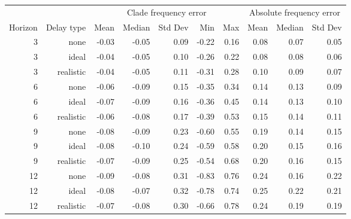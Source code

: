 
\begin{tabular*}{1.0\textwidth}{rrrrrrrrrr}
\toprule
        &            & \multicolumn{5}{c}{Clade frequency error} & \multicolumn{3}{c}{Absolute frequency error} \\
Horizon & Delay type & Mean & Median & Std Dev & Min & Max & Mean & Median & Std Dev \\
\midrule

3 & none & -0.03 & -0.05 & 0.09 & -0.22 & 0.16 & 0.08 & 0.07 & 0.05 \\
3 & ideal & -0.04 & -0.05 & 0.10 & -0.26 & 0.22 & 0.08 & 0.08 & 0.06 \\
3 & realistic & -0.04 & -0.05 & 0.11 & -0.31 & 0.28 & 0.10 & 0.09 & 0.07 \\
6 & none & -0.06 & -0.09 & 0.15 & -0.35 & 0.34 & 0.14 & 0.13 & 0.09 \\
6 & ideal & -0.07 & -0.09 & 0.16 & -0.36 & 0.45 & 0.14 & 0.13 & 0.10 \\
6 & realistic & -0.06 & -0.08 & 0.17 & -0.39 & 0.53 & 0.15 & 0.14 & 0.11 \\
9 & none & -0.08 & -0.09 & 0.23 & -0.60 & 0.55 & 0.19 & 0.14 & 0.15 \\
9 & ideal & -0.08 & -0.10 & 0.24 & -0.59 & 0.58 & 0.20 & 0.15 & 0.16 \\
9 & realistic & -0.07 & -0.09 & 0.25 & -0.54 & 0.68 & 0.20 & 0.16 & 0.15 \\
12 & none & -0.09 & -0.08 & 0.31 & -0.83 & 0.76 & 0.24 & 0.16 & 0.22 \\
12 & ideal & -0.08 & -0.07 & 0.32 & -0.78 & 0.74 & 0.25 & 0.22 & 0.21 \\
12 & realistic & -0.07 & -0.08 & 0.30 & -0.66 & 0.78 & 0.24 & 0.19 & 0.19 \\

\bottomrule
\end{tabular*}

